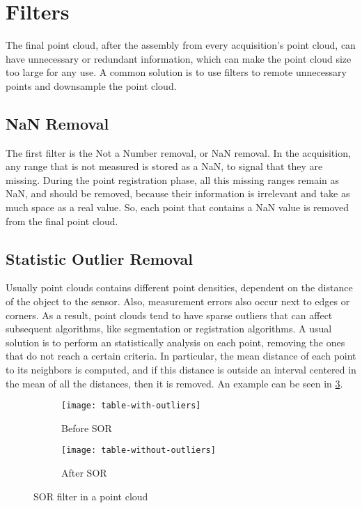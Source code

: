 \section{Filters}
\label{section:filters}

The final point cloud, after the assembly from every acquisition's point cloud, can have unnecessary or redundant information, which can make the point cloud size too large for any use. A common solution is to use filters to remote unnecessary points and downsample the point cloud.

\subsection{NaN Removal}

The first filter is the Not a Number removal, or NaN removal. In the acquisition, any range that is not measured is stored as a NaN, to signal that they are missing. During the point registration phase, all this missing ranges remain as NaN, and should be removed, because their information is irrelevant and take as much space as a real value. So, each point that contains a NaN value is removed from the final point cloud.

\subsection{Statistic Outlier Removal}

Usually point clouds contains different point densities, dependent on the distance of the object to the sensor. Also, measurement errors also occur next to edges or corners. As a result, point clouds tend to have sparse outliers that can affect subsequent algorithms, like segmentation or registration algorithms. A usual solution is to perform an statistically analysis on each point, removing the ones that do not reach a certain criteria. In particular, the mean distance of each point to its neighbors is computed, and if this distance is outside an interval centered in the mean of all the distances, then it is removed. An example can be seen in \cref{figure:sor-filter}.

\begin{figure}[h]
    
    \centering
    \begin{subfigure}[t]{0.5\textwidth}
        
        \centering
        \texttt{[image: table-with-outliers]}
        \caption{Before SOR}
        \label{figure:sor-filter-before}
    \end{subfigure}%
    \begin{subfigure}[t]{0.5\textwidth}
        \centering
        \texttt{[image: table-without-outliers]}
        \caption{After SOR}
        \label{figure:sor-filter-after}
    \end{subfigure}

    \caption{SOR filter in a point cloud}
    \label{figure:sor-filter}
\end{figure}


